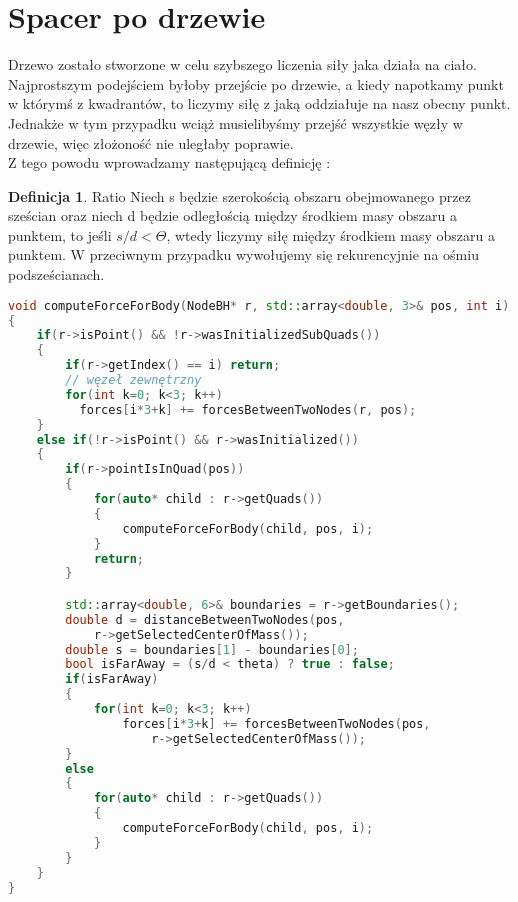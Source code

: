 \documentclass[14pt,twoside,a4paper]{article}
\theoremstyle{definition}
\newtheorem{definition}{Definicja}[section]
\begin{document}
\section{\LARGE Spacer po drzewie}

Drzewo zostało stworzone w celu szybszego liczenia siły jaka działa na ciało.\\ Najprostszym podejściem byłoby przejście po drzewie, a kiedy napotkamy punkt w którymś z kwadrantów, to liczymy siłę z jaką oddziałuje na nasz obecny punkt. Jednakże w tym przypadku wciąż musielibyśmy przejść wszystkie węzły w drzewie, więc złożoność nie uległaby poprawie.\\
\bigskip
Z tego powodu wprowadzamy następującą definicję\cite{Aarseth} :
\theoremstyle{definition}
\begin{definition}{Ratio}
Niech s będzie szerokością obszaru obejmowanego przez sześcian oraz niech d będzie odległością między środkiem masy obszaru a punktem, to jeśli $s/d < \Theta$, wtedy liczymy siłę między środkiem masy obszaru a punktem. W przeciwnym przypadku wywołujemy się rekurencyjnie na ośmiu podsześcianach.
\end{definition}

\begin{lstlisting}[language=C++, frame=single, framerule=2pt, caption=Liczenie siły oddziałującej na ciało w układzie]
void computeForceForBody(NodeBH* r, std::array<double, 3>& pos, int i)
{
    if(r->isPoint() && !r->wasInitializedSubQuads())
    {
        if(r->getIndex() == i) return;
		// węzeł zewnętrzny		
    	for(int k=0; k<3; k++) 
          forces[i*3+k] += forcesBetweenTwoNodes(r, pos);
    }
    else if(!r->isPoint() && r->wasInitialized())
    {
        if(r->pointIsInQuad(pos)) 
        {
            for(auto* child : r->getQuads()) 
            {
                computeForceForBody(child, pos, i);
            }
            return;
        }

        std::array<double, 6>& boundaries = r->getBoundaries();
        double d = distanceBetweenTwoNodes(pos, 
        	r->getSelectedCenterOfMass());
        double s = boundaries[1] - boundaries[0];
        bool isFarAway = (s/d < theta) ? true : false;
        if(isFarAway)
        {
            for(int k=0; k<3; k++) 
                forces[i*3+k] += forcesBetweenTwoNodes(pos,
                    r->getSelectedCenterOfMass());
        }
        else
        {
            for(auto* child : r->getQuads())
            {
                computeForceForBody(child, pos, i);
            }
        }
    }
}
\end{lstlisting}
\end{document}
